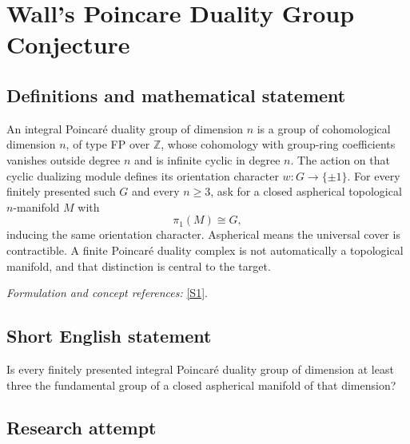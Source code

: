 \documentclass[11pt,a4paper]{article}
\newcommand{\Z}{\mathbb{Z}}
\newcommand{\sref}[2]{\hyperlink{source:#1:#2}{[S#2]}}
\newif\ifshowcatalogue
\newcommand{\cataloguescope}[1]{\ifshowcatalogue
 \paragraph{Exact scope in the supplied catalogue.}
 \begin{quote}\small #1\end{quote}\fi}
\numberwithin{equation}{section}
\begin{document}
\setcounter{section}{220}
\clearpage
\section{\texorpdfstring{Wall's Poincare Duality Group Conjecture}{Wall's Poincare Duality Group Conjecture}}\label{221}
\subsection{Definitions and mathematical statement}
An integral Poincar\'e duality group of dimension $n$ is a group of cohomological dimension $n$, of type FP over $\Z$, whose cohomology with group-ring coefficients vanishes outside degree $n$ and is infinite cyclic in degree $n$. The action on that cyclic dualizing module defines its orientation character $w:G\to\{\pm1\}$. For every finitely presented such $G$ and every $n\ge3$, ask for a closed aspherical topological $n$-manifold $M$ with
\[
 \pi_1(M)\cong G,
\]
inducing the same orientation character. Aspherical means the universal cover is contractible. A finite Poincar\'e duality complex is not automatically a topological manifold, and that distinction is central to the target.
\par\smallskip\textit{Formulation and concept references:} \sref{221}{1}.
\cataloguescope{For every n\ensuremath{\ge}3 and every finitely presented integral Poincaré duality group G of dimension n, prove that there is a closed aspherical topological n-manifold M with \ensuremath{\pi}1(M)\ensuremath{\cong}G and matching orientation character.}
\subsection{Short English statement}
Is every finitely presented integral Poincaré duality group of dimension at least three the fundamental group of a closed aspherical manifold of that dimension?
\subsection{Research attempt}
\end{document}
